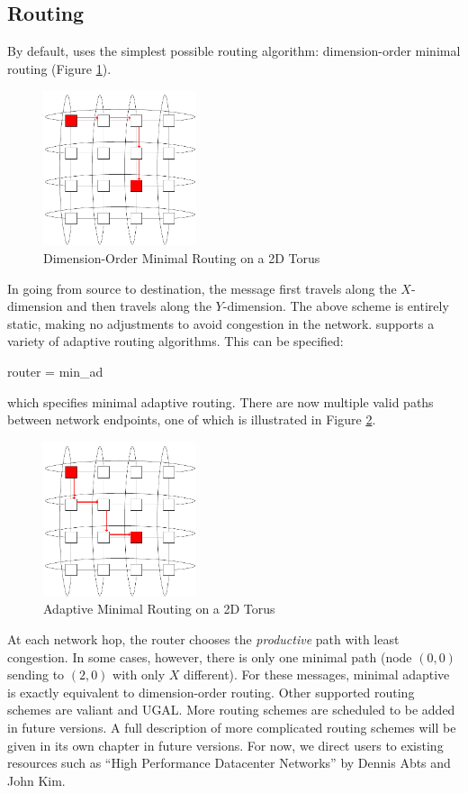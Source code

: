 \subsection{Routing}
\label{subsec:tutorial:routing}
By default, \sstmacro uses the simplest possible routing algorithm: dimension-order minimal routing (Figure \ref{fig:torus:basicrouting}).
\begin{figure}[h]
\centering
\includegraphics[width=0.4\textwidth]{figures/tikz/torus/minroutetorus.pdf}
\caption{Dimension-Order Minimal Routing on a 2D Torus}
\label{fig:torus:basicrouting}
\end{figure}
In going from source to destination, the message first travels along the $X$-dimension and then travels along the $Y$-dimension.
The above scheme is entirely static, making no adjustments to avoid congestion in the network.  
\sstmacro supports a variety of adaptive routing algorithms.  This can be specified:

\begin{ViFile}
router = min_ad
\end{ViFile}
which specifies minimal adaptive routing. 
There are now multiple valid paths between network endpoints, one of which is illustrated in Figure \ref{fig:torus:minadrouting}.
\begin{figure}[h!]
\centering
\includegraphics[width=0.4\textwidth]{figures/tikz/torus/minadroutetorus.pdf}
\caption{Adaptive Minimal Routing on a 2D Torus}
\label{fig:torus:minadrouting}
\end{figure}
At each network hop, the router chooses the \emph{productive} path with least congestion.  
In some cases, however, there is only one minimal path (node $(0,0)$ sending to $(2,0)$ with only $X$ different).
For these messages, minimal adaptive is exactly equivalent to dimension-order routing.  
Other supported routing schemes are valiant and UGAL.  More routing schemes are scheduled to be added in future versions.  
A full description of more complicated routing schemes will be given in its own chapter in future versions. 
For now, we direct users to existing resources such as ``High Performance Datacenter Networks'' by Dennis Abts and John Kim.
